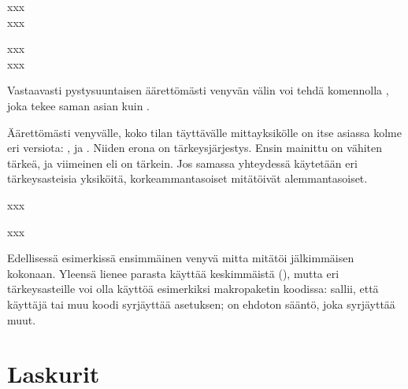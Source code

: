 \pagebreak[3]

\begin{koodilohkosis}
  xxx \\
  x\hfill x\hfill\hfill x
\end{koodilohkosis}

\begin{tulossis}
  xxx \\
  x\hfill x\hfill\hfill x
\end{tulossis}

Vastaavasti pystysuuntaisen äärettömästi venyvän välin voi tehdä
komennolla , joka tekee saman asian kuin .

Äärettömästi venyvälle, koko tilan täyttävälle mittayksikölle on itse
asiassa kolme eri versiota: ,  ja .
Niiden erona on tärkeysjärjestys. Ensin mainittu  on vähiten
tärkeä, ja viimeinen eli  on tärkein. Jos samassa
yhteydessä käytetään eri tär\-keys\-as\-tei\-sia yksiköitä,
korkeammantasoiset mitätöivät alemmantasoiset.

\pagebreak[3]

\begin{koodilohkosis}
  x\hspace{0mm plus 1filll}x\hspace{0mm plus 1fill}x
\end{koodilohkosis}

\begin{tulossis}
  x\hspace{0mm plus 1filll}x\hspace{0mm plus 1fill}x
\end{tulossis}

Edellisessä esimerkissä ensimmäinen venyvä mitta  mitätöi
jälkimmäisen  kokonaan. Yleensä lienee parasta käyttää
keskimmäistä (), mutta eri tärkeys\-asteille voi olla
käyttöä esimerkiksi makropaketin koodissa:  sallii, että
käyttäjä tai muu koodi syrjäyttää asetuksen;  on ehdoton
sääntö, joka syrjäyttää muut.


\section{Laskurit}

